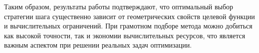 \documentclass{article}
\begin{document}
Таким образом, результаты работы подтверждают, что оптимальный выбор стратегии шага существенно зависит от геометрических свойств целевой функции и вычислительных ограничений. При грамотном подборе метода можно добиться как высокой точности, так и экономии вычислительных ресурсов, что является важным аспектом при решении реальных задач оптимизации.
\end{document}
